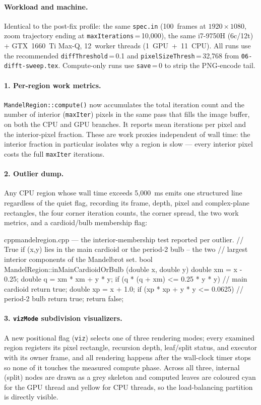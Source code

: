 \documentclass[
	english,
	letterpaper, oneside
]{article}
\begin{document}
\paragraph{Workload and machine.} Identical to the post-fix profile: the same
\texttt{spec.in} (100~frames at $1920\times1080$, zoom trajectory ending at
\texttt{maxIterations}\,=\,10{,}000), the same i7-9750H (6c/12t) + GTX~1660~Ti
Max-Q, 12~worker threads (1~GPU~+~11~CPU). All runs use the recommended
\texttt{diffThreshold}\,=\,0.1 and \texttt{pixelSizeThresh}\,=\,32{,}768 from
\texttt{06-difft-sweep.tex}. Compute-only runs use \texttt{save}\,=\,0 to strip
the PNG-encode tail.

\paragraph{1. Per-region work metrics.} \texttt{MandelRegion::compute()} now
accumulates the total iteration count and the number of interior
(\texttt{maxIter}) pixels in the same pass that fills the image buffer, on both
the CPU and GPU branches. It reports mean iterations per pixel and the
interior-pixel fraction. These are work proxies independent of wall time: the
interior fraction in particular isolates why a region is slow --- every
interior pixel costs the full \texttt{maxIter} iterations.

\paragraph{2. Outlier dump.} Any CPU region whose wall time exceeds 5{,}000~ms
emits one structured line regardless of the quiet flag, recording its frame,
depth, pixel and complex-plane rectangles, the four corner iteration counts,
the corner spread, the two work metrics, and a cardioid/bulb membership flag:

\begin{sourcecode}{cpp}{mandelregion.cpp --- the interior-membership test reported per outlier.}
// True if (x,y) lies in the main cardioid or the period-2 bulb -- the two
// largest interior components of the Mandelbrot set.
bool MandelRegion::inMainCardioidOrBulb (double x, double y)
{
  double xm = x - 0.25;
  double q  = xm * xm + y * y;
  if (q * (q + xm) <= 0.25 * y * y)   // main cardioid
    return true;
  double xp = x + 1.0;
  if (xp * xp + y * y <= 0.0625)      // period-2 bulb
    return true;
  return false;
}
\end{sourcecode}

\paragraph{3. \texttt{vizMode} subdivision visualizers.} A new positional flag
(\texttt{viz}) selects one of three rendering modes; every examined region
registers its pixel rectangle, recursion depth, leaf/split status, and executor
with its owner frame, and all rendering happens after the wall-clock
timer stops so none of it touches the measured compute phase. Across all three,
internal (split) nodes are drawn as a grey skeleton and computed leaves are
coloured cyan for the GPU thread and yellow for CPU threads,
so the load-balancing partition is directly visible.
\end{document}
